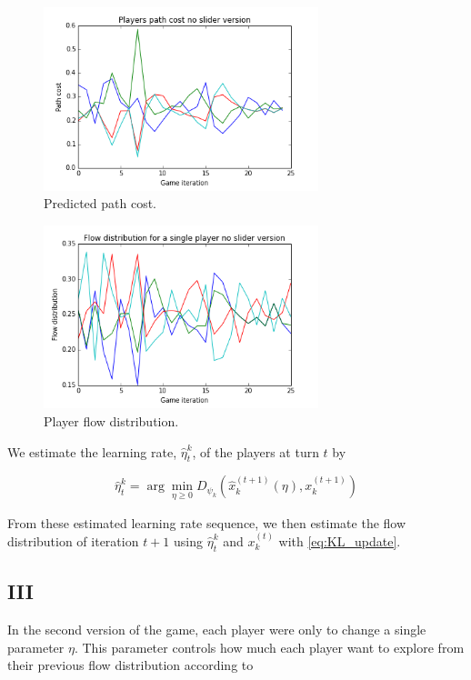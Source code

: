 \documentclass{sig-alternate-ipsn13}
\begin{document}
\begin{figure}
  \centering
  \includegraphics[width=80mm]{images/no_slider_path_costs.png}
  \caption{Predicted path cost.}
  \label{fig:predicted_path_cost}
\end{figure}


\begin{figure}
  \centering
  \includegraphics[width=80mm]{images/no_slider_actual_flow_distribution.png}
  \caption{Player flow distribution.}
  \label{fig:no_slider_player_flow_distribution}
\end{figure}

We estimate the learning rate, $\hat \eta^k_t$,  of the players at turn $t$ by

\[
  \hat \eta^k_t = \arg\min_{\eta \geq 0} D_{\psi_k}(\hat x_k^{(t+1)}(\eta), x^{(t+1)}_k)
\]


From these estimated learning rate sequence, we then estimate the flow distribution of iteration $t+1$ using $\hat \eta^k_t $ and $x_k^{(t)}$ with \ref{eq:KL_update}.


\subsection{III}

In the second version of the game, each player were only to change a single parameter $\eta$. This parameter controls how much each player want to explore from their previous flow distribution according to
\end{document}
